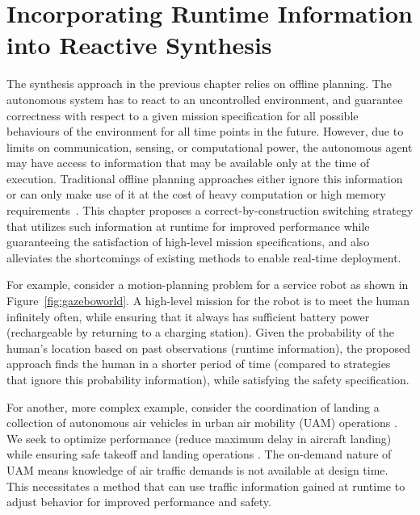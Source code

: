 

\chapter{Incorporating Runtime Information into Reactive Synthesis}


The synthesis approach in the previous chapter relies on offline planning. The autonomous system has to react to an uncontrolled environment, and guarantee correctness with respect to a given mission specification for all possible behaviours of the environment for all time points in the future. However, due to limits on communication, sensing, or computational power, the autonomous agent may have access to information that may be available only at the time of execution. Traditional offline planning approaches either ignore this information or can only make use of it at the cost of heavy computation or high memory requirements~\cite{Ehlerscost,jangcontinuous}. This chapter proposes a correct-by-construction switching strategy that utilizes such information at runtime for improved performance while guaranteeing the satisfaction of high-level mission specifications, and also alleviates the shortcomings of existing methods to enable real-time deployment. 

For example, consider a motion-planning problem for a service robot as shown in Figure~\ref{fig:gazeboworld}. A high-level mission for the robot is to meet the human infinitely often, while ensuring that it always has sufficient battery power (rechargeable by returning to a charging station). Given the probability of the human's location based on past observations (runtime information), the proposed approach finds the human in a shorter period of time (compared to strategies that ignore this probability information), while satisfying the safety specification. 

For another, more complex example, consider the coordination of landing a collection of autonomous air vehicles in urban air mobility (UAM) operations \cite{goyal2018urban,gipson2017nasa}. 
We seek to optimize performance (reduce  maximum delay in aircraft landing) while ensuring safe takeoff and landing operations \cite{thipphavong2018urban}. The on-demand nature of UAM means knowledge of air traffic demands is not available at design time. This necessitates a method that can use traffic information gained at runtime to adjust behavior for improved performance and safety. 

